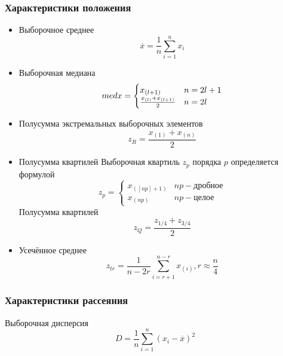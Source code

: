 \documentclass[main.tex]{subfiles}
\begin{document}
	\subsubsection{Характеристики положения}
	\begin{itemize}
		\item Выборочное среднее 
		\begin{equation}
			\overline{x} = \frac{1}{n}\sum_{i=1}^{n}{x_i}
		\end{equation}
		\item Выборочная медиана 
		\begin{equation}
			med x = 
			\begin{cases}
			    x_{(l+1)} &\text{$ n=2l+1$}\\
				\frac{x_{(l)} + x_{(l+1)}}{2} &\text{$ n=2l$}
			\end{cases}
		\end{equation}
		\item Полусумма экстремальных выборочных элементов 
		\begin{equation}
			 z_R = \frac{x_{(1)} + x_{(n)}}{2}
		\end{equation}
		\item Полусумма квартилей 
		\newline Выборочная квартиль $z_p$ порядка $p$ определяется формулой \begin{equation}
			z_p = 
			\begin{cases}
		       x_{([np]+1)} &\text{$np - $дробное}\\
		       x_{(np)}&\text{$np - $целое}
		    \end{cases}
		\end{equation}
		Полусумма квартилей \begin{equation}
			z_Q = \frac{z_{1/4} + z_{3/4}}{2}
		\end{equation}
		\item Усечённое среднее
		\begin{equation}
			z_{tr} = \frac{1}{n-2r}\sum_{i=r+1}^{n-r}{x_{(i)}}, r\approx\frac{n}{4}	   	
		\end{equation}
	\end{itemize}

	\subsubsection{Характеристики рассеяния}
	Выборочная дисперсия
	\begin{equation}
		D = \frac{1}{n}\sum_{i=1}^{n}{(x_i-\overline{x})^2}
	\end{equation}
	
\end{document}

